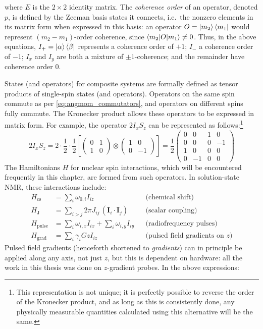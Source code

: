 where $E$ is the $2 \times 2$ identity matrix.
The \textit{coherence order} of an operator, denoted $p$, is defined by the Zeeman basis states it connects, i.e.\ the nonzero elements in its matrix form when expressed in this basis: an operator $O = \ket{m_2}\bra{m_1}$ would represent $(m_2 - m_1)$-order coherence, since $\braket{m_2|O|m_1} \neq 0$.
Thus, in the above equations, $I_+ = \ket{\alpha}\bra{\beta}$ represents a coherence order of $+1$; $I_-$ a coherence order of $-1$; $I_x$ and $I_y$ are both a mixture of $\pm 1$-coherence; and the remainder have coherence order $0$.

States (and operators) for composite systems are formally defined as tensor products of single-spin states (and operators)\autocite{Sakurai2021}.
Operators on the same spin commute as per \cref{eq:angmom_commutators}, and operators on different spins fully commute.
The Kronecker product allows these operators to be expressed in matrix form.\autocite{Hore2015}
For example, the operator $2I_xS_z$ can be represented as follows:\footnote{This representation is not unique; it is perfectly possible to reverse the order of the Kronecker product, and as long as this is consistently done, any physically measurable quantities calculated using this alternative will be the same.}
\begin{equation}
    \label{eq:composite_operator}
    2I_xS_z = 2 \cdot \frac{1}{2} \cdot \frac{1}{2} \left[ 
    \begin{pmatrix} 0 & 1 \\ 1 & 0 \end{pmatrix} \otimes
    \begin{pmatrix} 1 & 0 \\ 0 & -1 \end{pmatrix} \right]
    = \frac{1}{2} \begin{pmatrix} 0 & 0 & 1 & 0 \\ 0 & 0 & 0 & -1 \\ 1 & 0 & 0 & 0 \\ 0 & -1 & 0 & 0 \end{pmatrix}
\end{equation}
The Hamiltonians $H$ for nuclear spin interactions, which will be encountered frequently in this chapter, are formed from such operators.\autocite{Levitt2008}
In solution-state NMR, these interactions include:
\begin{align}
    H_\text{cs} &= \sum_i \omega_{0,i} I_{iz} & &\text{(chemical shift)} \label{eq:h_cs} \\
    H_\text{J} &= \sum_{i > j} 2\pi J_{ij} \,(\symbf{I}_{i}\cdot \symbf{I}_{j}) & &\text{(scalar coupling)} \label{eq:h_j} \\
    H_\text{pulse} &= \sum_i \omega_{i,x}I_{ix} + \sum_i \omega_{i,y}I_{iy} & &\text{(radiofrequency pulses)} \label{eq:h_pulse} \\
    H_\text{grad} &= \sum_i \gamma_i Gz I_{iz} & &\text{(pulsed field gradients on }z\text{)} \label{eq:h_grad}
\end{align}
Pulsed field gradients (henceforth shortened to \textit{gradients}) can in principle be applied along any axis, not just $z$, but this is dependent on hardware: all the work in this thesis was done on $z$-gradient probes.
In the above expressions:

